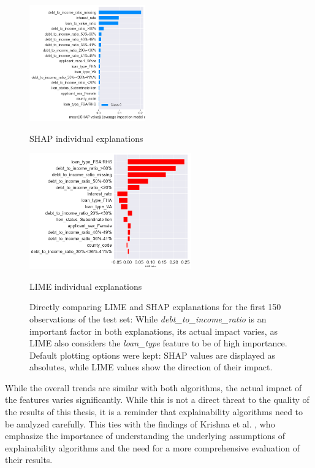 \begin{figure}[h]
    \centering
    \begin{minipage}{0.5\textwidth}
        \centering
        \includegraphics[width=\textwidth,height=5cm,keepaspectratio]{images/CHXX_UPDATE_SHAP_individual.png}
        \caption{SHAP individual explanations}
        \label{fig:SHAP_explanations}
    \end{minipage}\hfill
    \begin{minipage}{0.5\textwidth}
        \centering
        \includegraphics[width=\textwidth,height=5cm,keepaspectratio]{images/CHXX_UPDATE_LIME_individual.png}
        \caption{LIME individual explanations}
        \label{fig:LIME_explanations}
    \end{minipage}
    \caption*{Directly comparing LIME and SHAP explanations for the first 150 observations of the test set: While \textit{debt\_to\_income\_ratio} is an important factor in both explanations, its actual impact varies, as LIME also considers the \textit{loan\_type} feature to be of high importance. Default plotting options were kept: SHAP values are displayed as absolutes, while LIME values show the direction of their impact.}
\end{figure}

While the overall trends are similar with both algorithms, the actual impact of the features varies significantly. While this is not a direct threat to the quality of the results of this thesis, it is a reminder that explainability algorithms need to be analyzed carefully. 
This ties with the findings of Krishna et al. \parencite{Krishna2022}, who emphasize the importance of understanding the underlying assumptions of explainability algorithms and the need for a more comprehensive evaluation of their results.

